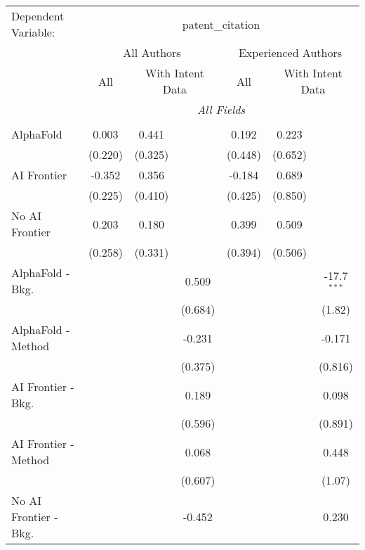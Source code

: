 \begingroup
\centering
\begin{tabular}{lcccccc}
   \tabularnewline \midrule \midrule
   Dependent Variable: & \multicolumn{6}{c}{patent\_citation}\\
 & \multicolumn{3}{c}{All Authors} & \multicolumn{3}{c}{Experienced Authors} \\
\cmidrule(lr){2-4} \cmidrule(lr){5-7}
 & \multicolumn{1}{c}{All} & \multicolumn{2}{c}{With Intent Data} & \multicolumn{1}{c}{All} & \multicolumn{2}{c}{With Intent Data} \\
\cmidrule(lr){2-2} \cmidrule(lr){3-4} \cmidrule(lr){5-5} \cmidrule(lr){6-7}
 & \multicolumn{6}{c}{\textit{All Fields}} \\ \\
   AlphaFold               & 0.003   & 0.441   &         & 0.192   & 0.223   &   \\   
                           & (0.220) & (0.325) &         & (0.448) & (0.652) &   \\   
   AI Frontier             & -0.352  & 0.356   &         & -0.184  & 0.689   &   \\   
                           & (0.225) & (0.410) &         & (0.425) & (0.850) &   \\   
   No AI Frontier          & 0.203   & 0.180   &         & 0.399   & 0.509   &   \\   
                           & (0.258) & (0.331) &         & (0.394) & (0.506) &   \\   
   AlphaFold - Bkg.        &         &         & 0.509   &         &         & -17.7$^{***}$\\   
                           &         &         & (0.684) &         &         & (1.82)\\   
   AlphaFold - Method      &         &         & -0.231  &         &         & -0.171\\   
                           &         &         & (0.375) &         &         & (0.816)\\   
   AI Frontier - Bkg.      &         &         & 0.189   &         &         & 0.098\\   
                           &         &         & (0.596) &         &         & (0.891)\\   
   AI Frontier - Method    &         &         & 0.068   &         &         & 0.448\\   
                           &         &         & (0.607) &         &         & (1.07)\\   
   No AI Frontier - Bkg.   &         &         & -0.452  &         &         & 0.230\\   

\end{tabular}
